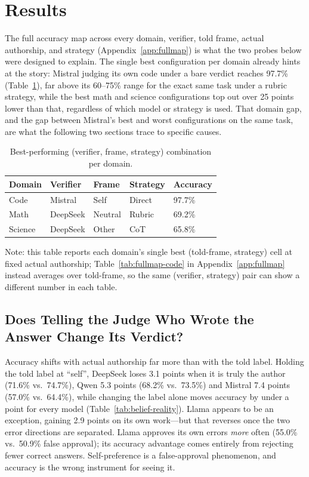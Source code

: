 \documentclass{article}
\begin{document}
\section{Results}
\label{sec:results}

The full accuracy map across every domain, verifier, told frame, actual authorship,
and strategy (Appendix~\ref{app:fullmap}) is what the two probes below were designed
to explain. The single best configuration per domain already hints at the story:
Mistral judging its own code under a bare verdict reaches 97.7\% (Table~\ref{tab:best-combo}),
far above its 60--75\% range for the exact same task under a rubric strategy, while the
best math and science configurations top out over 25 points lower than that, regardless
of which model or strategy is used. That domain gap, and the gap between Mistral's best
and worst configurations on the same task, are what the following two sections trace to
specific causes.

\begin{table}[H]
\centering
\small
\caption{Best-performing (verifier, frame, strategy) combination per domain.}
\label{tab:best-combo}
\begin{tabular}{lllll}
\toprule
Domain & Verifier & Frame & Strategy & Accuracy \\
\midrule
Code    & Mistral  & Self    & Direct & 97.7\% \\
Math    & DeepSeek & Neutral & Rubric & 69.2\% \\
Science & DeepSeek & Other   & CoT    & 65.8\% \\
\bottomrule
\end{tabular}
\vspace{2pt}
{\footnotesize Note: this table reports each domain's single best (told-frame,
strategy) cell at fixed actual authorship; Table~\ref{tab:fullmap-code} in
Appendix~\ref{app:fullmap} instead averages over told-frame, so the same
(verifier, strategy) pair can show a different number in each table.}
\end{table}

\subsection{Does Telling the Judge Who Wrote the Answer Change Its Verdict?}
\label{sec:results-belief}

Accuracy shifts with actual authorship far more than with the told label. Holding the told
label at ``self'', DeepSeek loses 3.1 points when it is truly the author (71.6\% vs.\
74.7\%), Qwen 5.3 points (68.2\% vs.\ 73.5\%) and Mistral 7.4 points (57.0\% vs.\ 64.4\%),
while changing the label alone moves accuracy by under a point for every model
(Table~\ref{tab:belief-reality}). Llama appears to be an exception, gaining 2.9 points on
its own work---but that reverses once the two error directions are separated. Llama
approves its own errors \emph{more} often (55.0\% vs.\ 50.9\% false approval); its accuracy
advantage comes entirely from rejecting fewer correct answers. Self-preference is a
false-approval phenomenon, and accuracy is the wrong instrument for seeing it.
\end{document}
